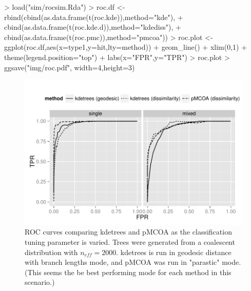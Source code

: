 \documentclass{article}
\begin{document}
\begin{Schunk}
\begin{Sinput}
> load("sim/rocsim.Rda")
> roc.df <- rbind(cbind(as.data.frame(t(roc.kde)),method="kde"),
+                 cbind(as.data.frame(t(roc.kde.d)),method="kdediss"),
+                 cbind(as.data.frame(t(roc.pmc)),method="pmcoa"))
> roc.plot <- ggplot(roc.df,aes(x=type1,y=hit,lty=method)) + geom_line() + xlim(0,1) + theme(legend.position="top") + labs(x="FPR",y="TPR")
> roc.plot
> ggsave("img/roc.pdf", width=4,height=3)
\end{Sinput}
\end{Schunk}

\begin{figure}
  \centering
  \includegraphics{img/rocmix.pdf}
  \caption{ROC curves comparing kdetrees and pMCOA as the
    classification tuning parameter is varied. Trees were generated
    from a coalescent distribution with $n_{eff}=2000$. kdetrees is
    run in geodesic distance with branch lengths mode, and pMCOA was
    run in "parastic" mode. (This seems the be best performing mode
    for each method in this scenario.)}
  \label{fig:roc}
\end{figure}
\end{document}
